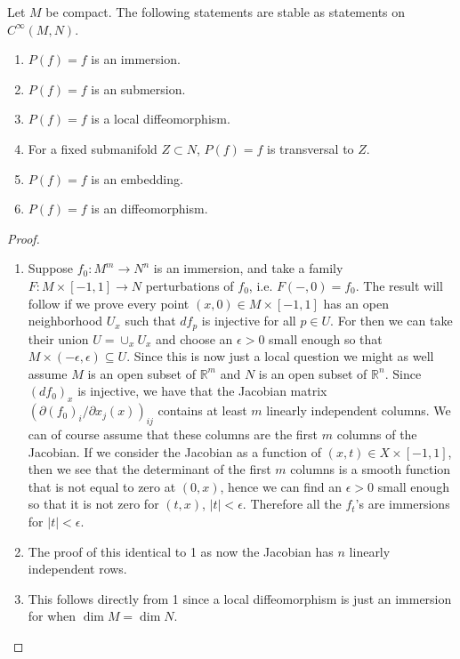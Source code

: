 \begin{thm}
\label{stability theorem}
Let $M$ be compact. The following statements are stable as statements on $C^\infty(M,N)$.
\begin{enumerate}
	\item $P(f) = f$ is an immersion.
	\item $P(f) = f$ is an submersion.
	\item $P(f) = f$ is a local diffeomorphism.
	\item For a fixed submanifold $Z \subset N$, $P(f) = f$ is transversal to $Z$.
	\item $P(f) = f$ is an embedding.
	\item $P(f) = f$ is an diffeomorphism.
\end{enumerate}
\end{thm}
\begin{proof}
\sloppyspace
\begin{enumerate}

	\item Suppose $f_0 : M^m \rightarrow N^n$ is an immersion, and take a family $F : M \times [-1,1] \rightarrow N$ perturbations of $f_0$, i.e. $F(-,0)=f_0$. The result will follow if we prove every point $(x,0) \in M \times [-1,1]$ has an open neighborhood $U_x$ such that $df_p$ is injective for all $p \in U$. For then we can take their union $U = \cup_x U_x$ and choose an $\epsilon>0$ small enough so that $M \times (-\epsilon,\epsilon) \subseteq U$. Since this is now just a local question we might as well assume $M$ is an open subset of $\mathbb R^m$ and $N$ is an open subset of $\mathbb R^n$. Since $(df_0)_x$ is injective, we have that the Jacobian matrix $(\partial (f_0)_i / \partial x_j(x))_{ij}$ contains at least $m$ linearly independent columns. We can of course assume that these columns are the first $m$ columns of the Jacobian. If we consider the Jacobian as a function of $(x,t) \in X \times [-1,1]$, then we see that the determinant of the first $m$ columns is a smooth function that is not equal to zero at $(0,x)$, hence we can find an $\epsilon>0$ small enough so that it is not zero for $(t,x)$, $|t|<\epsilon$. Therefore all the $f_t$'s are immersions for $|t|<\epsilon$.
	
	\item The proof of this identical to 1 as now the Jacobian has $n$ linearly independent rows.
	
	\item This follows directly from 1 since a local diffeomorphism is just an immersion for when $\dim M = \dim N$.
	

\end{enumerate}
\end{proof}
